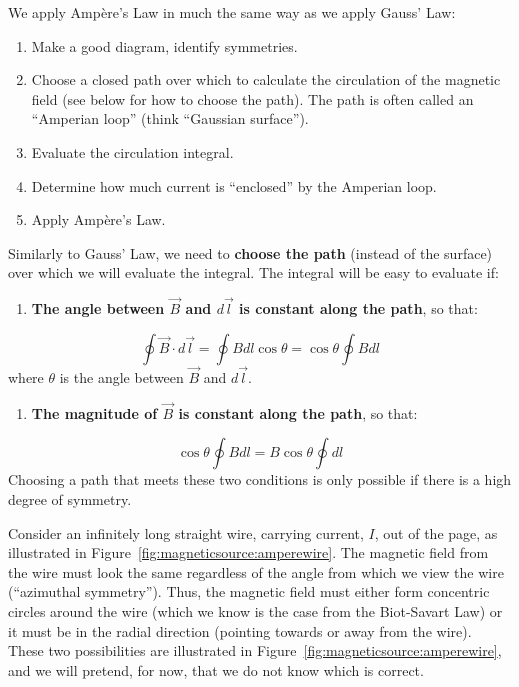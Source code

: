 We apply Ampère's Law in much the same way as we apply Gauss' Law:

\begin{enumerate}
\item Make a good diagram, identify symmetries.
\item Choose a closed path over which to calculate the circulation of the magnetic field (see below for how to choose the path). The path is often called an ``Amperian loop'' (think ``Gaussian surface'').
\item Evaluate the circulation integral.
\item Determine how much current is ``enclosed'' by the Amperian loop.
\item Apply Ampère's Law.
\end{enumerate}

Similarly to Gauss' Law, we need to \textbf{choose the path} (instead of the surface) over which we will evaluate the integral. The integral will be easy to evaluate if:

\begin{enumerate}
\item \textbf{The angle between $\vec B$ and $d\vec l$ is constant along the path}, so that:
\end{enumerate}
\begin{equation}
\oint  \vec B \cdot d\vec l = \oint B dl \cos\theta = \cos\theta \oint B dl
\end{equation}
where $\theta$ is the angle between $\vec B$ and $d\vec l$.

\begin{enumerate}[resume]
\item \textbf{The magnitude of $\vec B$ is constant along the path}, so that:
\end{enumerate}
\begin{equation}
\cos\theta \oint B dl = B\cos\theta \oint dl
\end{equation}
Choosing a path that meets these two conditions is only possible if there is a high degree of symmetry.

Consider an infinitely long straight wire, carrying current, $I$, out of the page, as illustrated in Figure~\ref{fig:magneticsource:amperewire}. The magnetic field from the wire must look the same regardless of the angle from which we view the wire (``azimuthal symmetry''). Thus, the magnetic field must either form concentric circles around the wire (which we know is the case from the Biot-Savart Law) or it must be in the radial direction (pointing towards or away from the wire). These two possibilities are illustrated in Figure~\ref{fig:magneticsource:amperewire}, and we will pretend, for now, that we do not know which is correct.


